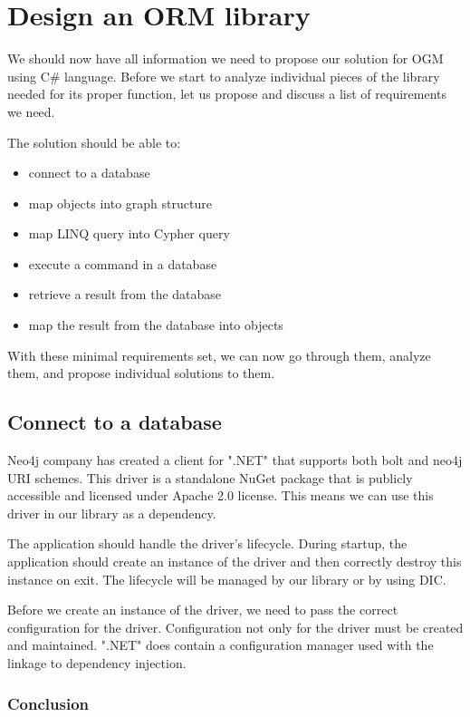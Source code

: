 \chapter {Design an ORM library}

We should now have all information we need to propose our solution for OGM using C\# language. Before we start to analyze individual pieces of the library needed for its proper function, let us propose and discuss a list of requirements we need.

The solution should be able to:
\begin{itemize}
    \item {connect to a database}
    \item {map objects into graph structure}
    \item {map LINQ query into Cypher query}
    \item {execute a command in a database}
    \item {retrieve a result from the database}
    \item {map the result from the database into objects}
\end{itemize}

With these minimal requirements set, we can now go through them, analyze them, and propose individual solutions to them.

\section{Connect to a database}

Neo4j company has created a client for ".NET" that supports both bolt and neo4j URI schemes. \cite{noauthor_client_nodate} This driver is a standalone NuGet package that is publicly accessible and licensed under Apache 2.0 license. This means we can use this driver in our library as a dependency.

The application should handle the driver's lifecycle. During startup, the application should create an instance of the driver and then correctly destroy this instance on exit. The lifecycle will be managed by our library or by using DIC.

Before we create an instance of the driver, we need to pass the correct configuration for the driver. Configuration not only for the driver must be created and maintained. ".NET" does contain a configuration manager used with the linkage to dependency injection.

\subsection{Conclusion}

